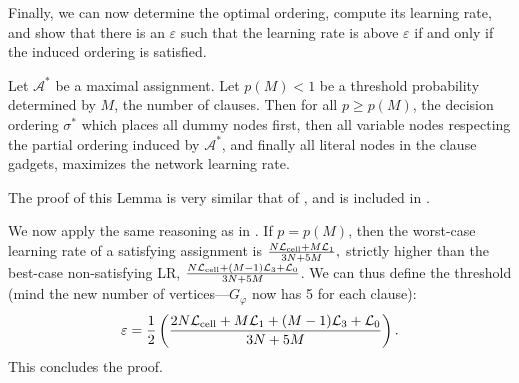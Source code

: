 Finally, we can now determine the optimal ordering, compute its learning rate, and show that there is an $ \varepsilon $ such that the learning rate is above $ \varepsilon $ if and only if the induced ordering is satisfied.

\begin{lemma} \label{lemma:maj_bestOrder}
    Let $\mathcal{A}^*$ be a maximal assignment.  Let $p(M) < 1$ be a threshold probability determined by $M$, the number of clauses. Then for all $p \geq p(M)$, the decision ordering $\sigma^*$ which places all dummy nodes first, then all variable nodes respecting the partial ordering induced by $\mathcal{A}^*$, and finally all literal nodes in the clause gadgets, maximizes the network learning rate.
\end{lemma}

The proof of this Lemma is very similar that of , and is included in \appmaj.

We now apply the same reasoning as in .
If $ p = p(M) $, then the worst-case learning rate of a satisfying assignment is $\frac{N\mathcal{L}_{\text{cell}} + M\mathcal{L}_1}{3N + 5M},$ strictly higher than the best-case non-satisfying LR, $\frac{N\mathcal{L}_{\text{cell}} + (M-1)\mathcal{L}_3 + \mathcal{L}_0}{3N + 5M}$. We can thus define the threshold (mind the new number of vertices---$ G_\varphi $ now has 5 for each clause):
\begin{align*}
    \varepsilon = \frac{1}{2}\left(\frac{2N\mathcal{L}_{\text{cell}} + M\mathcal{L}_1 + (M-1)\mathcal{L}_3 + \mathcal{L}_0}{3N + 5M}\right).
\end{align*}
This concludes the proof.
